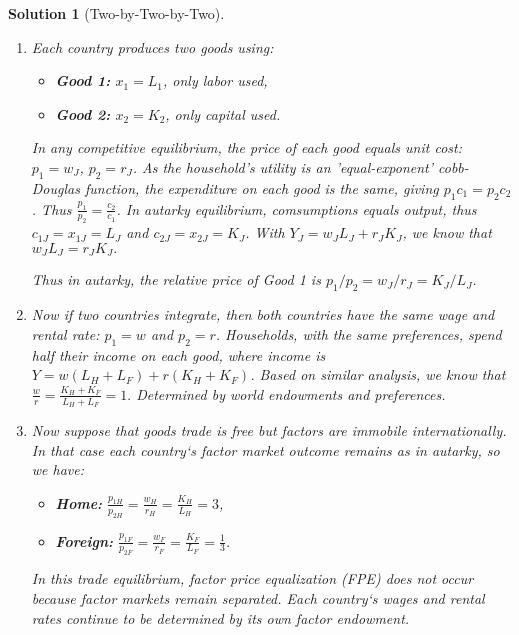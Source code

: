 \documentclass[a4paper,12pt]{article} %
\theoremstyle{nonitalic}
\newtheorem{solution}{Solution}
\begin{document}
\begin{solution}[Two-by-Two-by-Two]
    \

    \begin{enumerate}
        \item[1.] Each country produces two goods using:
            \begin{itemize}
                \item \textbf{Good 1:} $x_1 = L_1$, only labor used,
                \item \textbf{Good 2:} $x_2 = K_2$, only capital used.
            \end{itemize}
            In any competitive equilibrium, the price of each good equals unit cost: $p_1 = w_J$, $p_2 = r_J$.
            As the household's utility is an 'equal-exponent' cobb-Douglas function, the expenditure on each good is the same, giving $p_1 c_1 = p_2 c_2$.
            Thus $\frac{p_1}{p_2} = \frac{c_2}{c_1}$. In autarky equilibrium, comsumptions equals output, thus
            $c_{1J} = x_{1J} =L_J$ and $c_{2J} = x_{2J} = K_J$. With $Y_J = w_J L_J + r_J K_J$, we know that $w_J L_J = r_J K_J.$

            Thus in autarky, the relative price of Good 1 is $p_1/p_2 = w_J/r_J = K_J/L_J$.

        \item[2.] Now if two countries integrate, then both countries have the same wage and rental rate: $p_1 = w$ and $p_2 = r$.
        Households, with the same preferences, spend half their income on each good, where income is $Y = w(L_H + L_F) + r(K_H + K_F)$.
        Based on similar analysis, we know that $\frac{w}{r} = \frac{K_H + K_F}{L_H + L_F} = 1.$ Determined by world endowments and preferences.

        \item[3.] Now suppose that goods trade is free but factors are immobile internationally. 
        In that case each country`s factor market outcome remains as in autarky, so we have:
        \begin{itemize}
            \item \textbf{Home:} $\frac{p_{1H}}{p_{2H}} = \frac{w_H}{r_H} = \frac{K_H}{L_H} = 3$,
            \item \textbf{Foreign:} $\frac{p_{1F}}{p_{2F}} = \frac{w_F}{r_F} = \frac{K_F}{L_F} = \frac{1}{3}$.
        \end{itemize}
        In this trade equilibrium, factor price equalization (FPE) does not occur because factor markets remain separated.
        Each country`s wages and rental rates continue to be determined by its own factor endowment.


\end{enumerate}
\end{solution}
\end{document}
